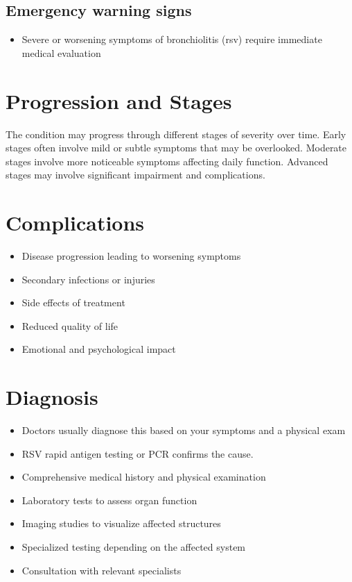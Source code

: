 \subsection{Emergency warning signs}
\begin{itemize}[noitemsep]
  \item Severe or worsening symptoms of bronchiolitis (rsv) require immediate medical evaluation
\end{itemize}
\section{Progression and Stages}
The condition may progress through different stages of severity over time. Early stages often involve mild or subtle symptoms that may be overlooked. Moderate stages involve more noticeable symptoms affecting daily function. Advanced stages may involve significant impairment and complications.
\section{Complications}
\begin{itemize}[noitemsep]
  \item Disease progression leading to worsening symptoms
  \item Secondary infections or injuries
  \item Side effects of treatment
  \item Reduced quality of life
  \item Emotional and psychological impact
\end{itemize}
\section{Diagnosis}
\begin{itemize}[noitemsep]
  \item Doctors usually diagnose this based on your symptoms and a physical exam
  \item RSV rapid antigen testing or PCR confirms the cause.
  \item Comprehensive medical history and physical examination
  \item Laboratory tests to assess organ function
  \item Imaging studies to visualize affected structures
  \item Specialized testing depending on the affected system
  \item Consultation with relevant specialists
\end{itemize}
